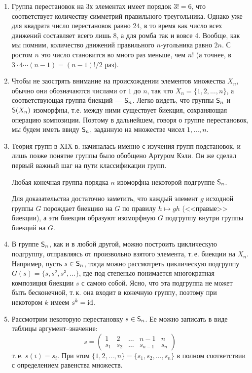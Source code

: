 \begin{enumerate}
\item Группа перестановок на 3х элементах имеет порядок $3!=6$, что соответствует количеству симметрий правильного треугольника.
Однако уже для квадрата число перестановок равно $24$, в то время как число всех движений составляет всего лишь 8, а для ромба так и вовсе 4. Вообще, как мы помним, количество движений правильного $n$-угольника равно $2n$. С ростом $n$ это число становится во много раз меньше, чем $n!$ (а точнее, в $3\cdot 4\cdots (n-1)=(n-1)!/2$ раз).
\item Чтобы не заострять внимание на происхождении элементов множества $X_n$, обычно они обозначаются числами от $1$ до $n$, так что $X_n=\{1,2,\dots, n\}$, а соответствующая группа биекций --- ${\mathsf{S}}_n$. Легко видеть, что группы ${\mathsf{S}}_n$ и ${\mathsf{S}}(X_n)$ изоморфны, т.е. между ними существует биекция, сохраняющая операцию композиции. Поэтому в дальнейшем, говоря о группе перестановок, мы будем иметь ввиду ${\mathsf{S}}_n$, заданную на множестве чисел $1,\dots, n$.
\item Теория групп в XIX в. начиналась именно с изучения групп подстановок, и лишь позже понятие группы было обобщено Артуром Кэли. Он же сделал первый важный шаг на пути классификации групп.
\begin{thrm}[Кэли]
Любая конечная группа порядка $n$ изоморфна некоторой подгруппе ${\mathsf{S}}_n$.
\end{thrm}
Для доказательства достаточно заметить, что каждый элемент $g$ исходной группы $G$ порождает биекцию на $G$ по правилу $h\mapsto gh$ (<<правые>> биекции), а эти биекции образуют изоморфную $G$ подгруппу внутри группы биекций на $G$.
\item В группе ${\mathsf{S}}_n$, как и в любой другой, можно построить циклическую подгруппу, отправляясь от произвольно взятого элемента, т.\,е. биекции на $X_n$. Например, пусть $s\in{\mathsf{S}}_n$, тогда можно рассмотреть циклическую подгруппу $G(s)=\{s,s^2,s^3,\dots\}$, где под степенью понимается многократная композиция биекции $s$ с самою собой. Ясно, что эта подгруппа не может быть бесконечной, т.\,к. она входит в конечную группу, поэтому при некотором $k$ имеем $s^k=\mathrm{id}$.

\item Рассмотрим некоторую перестановку $s\in {\mathsf{S}}_n$. Ее можно записать в виде таблицы аргумент--значение:
$$
s=
\begin{pmatrix}
1 & 2 & \dots & n-1 & n \\
s_1 & s_2 & \dots & s_{n-1} & s_n
\end{pmatrix}
$$
т.\,е. $s(i)=s_i$. При этом $\{1,2,\dots,n\}=\{s_1,s_2,\dots,s_n\}$ в полном соответствии с определением равенства множеств.


\end{enumerate}
